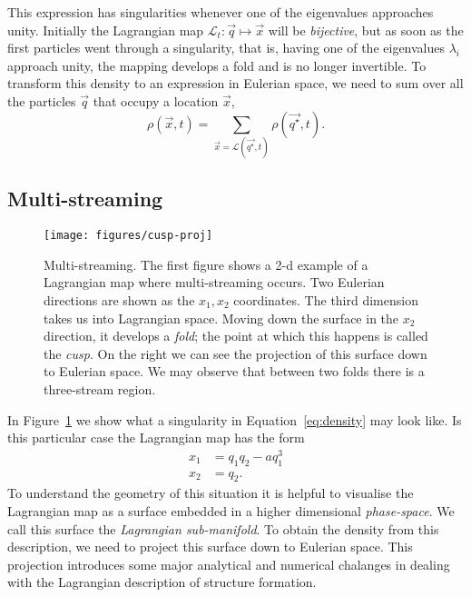 \begin{subappendices}
This expression has singularities whenever one of the eigenvalues approaches unity. Initially the Lagrangian map $\mathcal{L}_t: \vec{q} \mapsto \vec{x}$ will be \emph{bijective}, but as soon as the first particles went through a singularity, that is, having one of the eigenvalues $\lambda_i$ approach unity, the mapping develops a fold and is no longer invertible. To transform this density to an expression in Eulerian space, we need to sum over all the particles $\vec{q}$ that occupy a location $\vec{x}$,
\begin{equation}
\rho(\vec{x}, t) = \sum_{\vec{x} = \mathcal{L}(\vec{q^{\star}}, t)} \rho(\vec{q^{\star}}, t).
\label{eq:density-stack}
\end{equation}

\subsection{Multi-streaming}\label{section:ch1-catastrophe}
\begin{figure}
    \centering
    \texttt{[image: figures/cusp-proj]}
    \caption{Multi-streaming. The first figure shows a 2-d example of a Lagrangian map where multi-streaming occurs. Two Eulerian directions are shown as the $x_1, x_2$ coordinates. The third dimension takes us into Lagrangian space. Moving down the surface in the $x_2$ direction, it develops a \emph{fold}; the point at which this happens is called the \emph{cusp}. On the right we can see the projection of this surface down to Eulerian space. We may observe that between two folds there is a three-stream region.} \label{fig:simple-cusp}
\end{figure}

In Figure~\ref{fig:simple-cusp} we show what a singularity in Equation~\ref{eq:density} may look like. Is this particular case the Lagrangian map has the form
\begin{align}
    x_1 &= q_1 q_2 - a q_1^3 \\
    x_2 &= q_2.
\end{align}
To understand the geometry of this situation it is helpful to visualise the Lagrangian map as a surface embedded in a higher dimensional \emph{phase-space}. We call this surface the \emph{Lagrangian sub-manifold}. To obtain the density from this description, we need to project this surface down to Eulerian space. This projection introduces some major analytical and numerical chalanges in dealing with the Lagrangian description of structure formation.


\end{subappendices}
